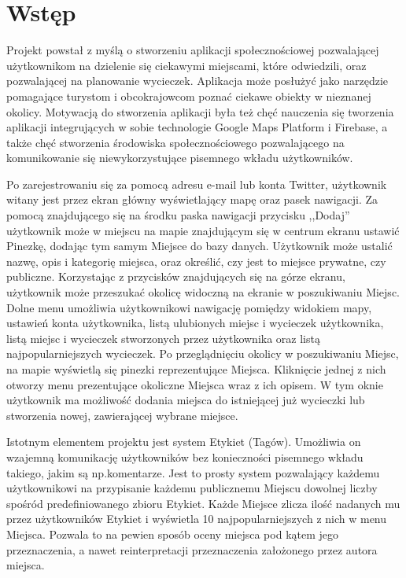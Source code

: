 \newpage
\section{Wstęp}

\vspace{1cm}
    Projekt powstał z myślą o stworzeniu aplikacji społecznościowej pozwalającej użytkownikom na dzielenie się ciekawymi miejscami, które odwiedzili, oraz 
    pozwalającej na planowanie wycieczek. Aplikacja może posłużyć jako narzędzie pomagające turystom i obcokrajowcom poznać ciekawe obiekty w nieznanej okolicy.
    Motywacją do stworzenia aplikacji była też chęć nauczenia się tworzenia aplikacji integrujących w sobie technologie Google Maps Platform i Firebase, a także chęć stworzenia środowiska 
    społecznościowego pozwalającego na komunikowanie się niewykorzystujące pisemnego wkładu użytkowników.  

    Po zarejestrowaniu się za pomocą adresu e-mail lub konta Twitter, użytkownik witany jest przez ekran główny wyświetlający mapę oraz pasek nawigacji.
    Za pomocą znajdującego się na środku paska nawigacji przycisku ,,Dodaj'' użytkownik może w miejscu na mapie znajdującym się w centrum ekranu ustawić Pinezkę, 
    dodając tym samym Miejsce do bazy danych. Użytkownik może ustalić nazwę, opis i kategorię miejsca, oraz określić, czy jest to miejsce prywatne, czy publiczne. Korzystając z przycisków znajdujących się
    na górze ekranu, użytkownik może przeszukać okolicę widoczną na ekranie w poszukiwaniu Miejsc. Dolne menu umożliwia użytkownikowi nawigację pomiędzy widokiem mapy,
    ustawień konta użytkownika, listą ulubionych miejsc i wycieczek użytkownika, listą miejsc i wycieczek stworzonych przez użytkownika oraz listą najpopularniejszych wycieczek.
    Po przeglądnięciu okolicy w poszukiwaniu Miejsc, na mapie wyświetlą się pinezki reprezentujące Miejsca. Kliknięcie jednej z nich otworzy menu prezentujące okoliczne Miejsca wraz z ich opisem.
    W tym oknie użytkownik ma możliwość dodania miejsca do istniejącej już wycieczki lub stworzenia nowej, zawierającej wybrane miejsce. 

    Istotnym elementem projektu jest system Etykiet (Tagów). Umożliwia on wzajemną komunikację użytkowników bez konieczności pisemnego wkładu
    takiego, jakim są np.\@ komentarze. Jest to prosty system pozwalający każdemu użytkownikowi na przypisanie każdemu publicznemu Miejscu dowolnej liczby spośród predefiniowanego zbioru Etykiet.
    Każde Miejsce zlicza ilość nadanych mu przez użytkowników Etykiet i wyświetla 10 najpopularniejszych z nich w menu Miejsca. Pozwala to na pewien sposób oceny miejsca pod kątem jego przeznaczenia,
    a nawet reinterpretacji przeznaczenia założonego przez autora miejsca. 

